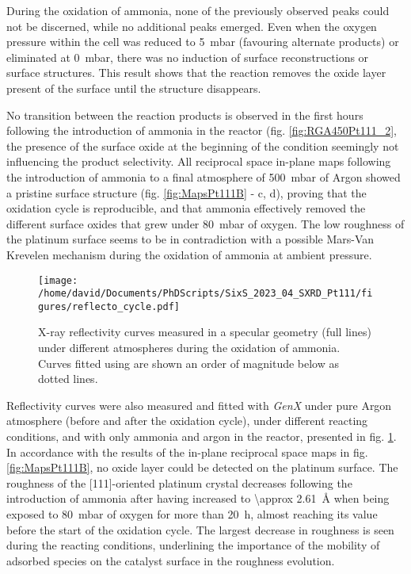 During the oxidation of ammonia, none of the previously observed peaks could not be discerned, while no additional peaks emerged.
Even when the oxygen pressure within the cell was reduced to \qty{5}{\milli\bar} (favouring alternate products) or eliminated at \qty{0}{\milli\bar}, there was no induction of surface reconstructions or surface structures.
This result shows that the reaction removes the oxide layer present of the surface until the structure disappears.

No transition between the reaction products is observed in the first hours following the introduction of ammonia in the reactor (fig. \ref{fig:RGA450Pt111_2}, the presence of the surface oxide at the beginning of the condition seemingly not influencing the product selectivity.
All reciprocal space in-plane maps following the introduction of ammonia to a final atmosphere of \qty{500}{\milli\bar} of Argon showed a pristine surface structure (fig. \ref{fig:MapsPt111B} - c, d), proving that the oxidation cycle is reproducible, and that ammonia effectively removed the different surface oxides that grew under \qty{80}{\milli\bar} of oxygen.
The low roughness of the platinum surface seems to be in contradiction with a possible Mars-Van Krevelen mechanism during the oxidation of ammonia at ambient pressure.

\begin{figure}[!htb]
    \centering
    \texttt{[image: /home/david/Documents/PhDScripts/SixS\_2023\_04\_SXRD\_Pt111/figures/reflecto\_cycle.pdf]}
    \caption{
    	X-ray reflectivity curves measured in a specular geometry (full lines) under different atmospheres during the oxidation of ammonia.
    	Curves fitted using  are shown an order of magnitude below as dotted lines.
    }
    \label{fig:ReflectoCycle}
\end{figure}

Reflectivity curves were also measured and fitted with \textit{GenX} under pure Argon atmosphere (before and after the oxidation cycle), under different reacting conditions, and with only ammonia and argon in the reactor, presented in fig. \ref{fig:ReflectoCycle}.
In accordance with the results of the in-plane reciprocal space maps in fig. \ref{fig:MapsPt111B}, no oxide layer could be detected on the platinum surface.
The roughness of the [111]-oriented platinum crystal decreases following the introduction of ammonia after having increased to \qty{\approx 2.61}{\angstrom} when being exposed to \qty{80}{\milli\bar} of oxygen for more than \qty{20}{\hour}, almost reaching its value before the start of the oxidation cycle.
The largest decrease in roughness is seen during the reacting conditions, underlining the importance of the mobility of adsorbed species on the catalyst surface in the roughness evolution.

